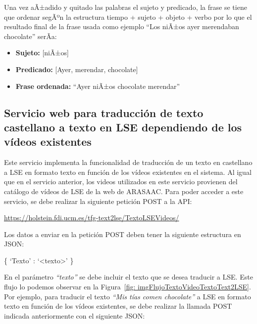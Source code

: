Una vez aÃ±adido y quitado las palabras el sujeto y predicado, la frase se tiene que ordenar segÃºn la estructura tiempo + sujeto + objeto + verbo por lo que el resultado final de la frase usada como ejemplo ``Los niÃ±os ayer merendaban chocolate'' serÃ­a: 

\begin{center}
	\begin{itemize}
		\item \textbf{Sujeto:}  [niÃ±os]
		\item \textbf{Predicado:} [Ayer, merendar, chocolate]
		\item \textbf{Frase ordenada:} ``Ayer niÃ±os chocolate merendar'' 
		
		
	\end{itemize}
\end{center}


\subsection{Servicio web para traducción de texto castellano a texto en LSE dependiendo de los vídeos existentes}

Este servicio implementa la funcionalidad de traducción de un texto en castellano a LSE en formato texto en función de los vídeos existentes en el sistema. Al igual que en el servicio anterior, los videos utilizados en este servicio provienen del catálogo de vídeos de LSE de la web de ARASAAC. Para poder acceder a este servicio, se debe realizar la siguiente petición POST a la API:\\

\begin{shaded}
	\url{https://holstein.fdi.ucm.es/tfg-text2lse/TextoLSEVideos/  }	
\end{shaded}


Los datos a enviar en la petición POST deben tener la siguiente estructura en JSON: 
\begin{center}
	
	\{ `Texto' : `<texto>' \}
	
\end{center}


En el parámetro \textit{``texto''} se debe incluir el texto que se desea traducir a LSE. Este flujo lo podemos observar en la Figura~\ref {fig: imgFlujoTextoVideoTextoText2LSE}.\\

Por ejemplo, para traducir el texto \textit{``Mis tías comen chocolate''} a LSE en formato texto en función de los vídeos existentes, se debe realizar la llamada POST indicada anteriormente con el siguiente JSON:



